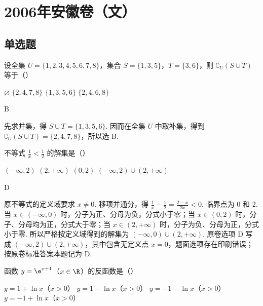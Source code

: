 \chapter{2006年安徽卷（文）}
\section{单选题}
\begin{problem}
设全集 \(U = \{1, 2, 3, 4, 5, 6, 7, 8\}\)，集合 \(S = \{1, 3, 5\}\)，\(T = \{3, 6\}\)，则 \(\complement_U(S \cup T)\) 等于（\quad）

\choices
    {\(\varnothing\)}
    {\(\{2, 4, 7, 8\}\)}
    {\(\{1,3,5,6\}\)}
    {\(\{2,4,6,8\}\)}
\end{problem}

\begin{answer}
B
\end{answer}

\begin{solution}
先求并集，得 \(S\cup T=\{1,3,5,6\}\). 因而在全集 \(U\) 中取补集，得到 \(\complement_U(S\cup T)=\{2,4,7,8\}\)，所以选 B.
\end{solution}

\begin{problem}
不等式 \(\frac{1}{x} < \frac{1}{2}\) 的解集是（\quad）

\choices
    {\((-\infty, 2)\)}
    {\((2, +\infty)\)}
    {\((0, 2)\)}
    {\((-\infty, 2) \cup (2, +\infty)\)}
\end{problem}

\begin{answer}
D
\end{answer}

\begin{solution}
原不等式的定义域要求 \(x\ne0\). 移项并通分，得 \(\frac{1}{x}-\frac{1}{2}=\frac{2-x}{2x}<0\). 临界点为 \(0\) 和 \(2\). 当 \(x\in(-\infty,0)\) 时，分子为正、分母为负，分式小于零；当 \(x\in(0,2)\) 时，分子、分母均为正，分式大于零；当 \(x\in(2,+\infty)\) 时，分子为负、分母为正，分式小于零. 所以严格按定义域得到的解集为 \(\left(-\infty,0\right)\cup\left(2,+\infty\right)\). 原卷选项 D 写成 \((-\infty,2)\cup(2,+\infty)\)，其中包含无定义点 \(x=0\)，题面选项存在印刷错误；按原卷标准答案本题记为 D.
\end{solution}

\begin{problem}
函数 \( y = \e^{x + 1} \)（\(x \in \R\)）的反函数是（\quad）

\choices
    {\( y = 1 + \ln x \)（\(x > 0\)）}
    {\( y = 1 - \ln x \)（\(x > 0\)）}
    {\( y = -1 - \ln x \)（\(x > 0\)）}
    {\( y = -1 + \ln x \)（\(x > 0\)）}
\end{problem}


